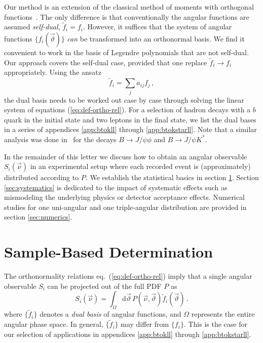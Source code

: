 \documentclass[aps,nofootinbib,preprintnumbers,prd,twocolumn]{revtex4-1}
\newcommand{\dual}[1]{\tilde{#1}}
\newcommand{\nuvec}{\vec{\nu}}
\newcommand{\refeq}[1]{eq.~(\ref{eq:#1})}
\newcommand{\rmdx}[1]{\mbox{d} #1 \,} %
\newcommand{\thvec}{\vec{\vartheta}}
\renewcommand{\theta}{\vartheta}
\begin{document}
Our method is an extension of the classical method of moments with
orthogonal functions~\cite[sec. 8.2]{James:2006zz}. The only difference
is that conventionally the angular functions are assumed
\emph{self-dual}, $\dual{f}_i = f_i$. However, it suffices that the
system of angular functions $\{f_i(\thvec)\}$ \emph{can} be transformed into
an orthonormal basis. We find it convenient to work
in the basis of Legendre polynomials that are not self-dual.
Our approach covers the self-dual case, provided that one
replace $\dual{f}_i \to f_i$ appropriately.
Using the ansatz
\begin{equation}
  \label{eq:dual-ansatz}
  \dual{f}_i = \sum_{j} a_{ij} f_j \,,
\end{equation}
the dual basis needs to be worked out case by case through solving the
linear system of equations (\ref{eq:def-ortho-rel}). For a selection
of hadron decays with a $b$ quark in the initial state and two leptons
in the final state, we list the dual bases in a series of appendices
\ref{app:btokll} through \ref{app:btokstarll}. Note that a
similar analysis was done in~\cite{Dighe:1998vk} for the decays $B \to
J/\psi \phi$ and $B \to J/\psi K^{*}$.

In the remainder of this letter we discuss how to obtain an angular
observable $S_i(\nuvec)$ in an experimental setup where each recorded
event is (approximately) distributed according to $P$.  We establish
the statistical basics in section \ref{sec:sample-based-det}. Section
\ref{sec:systematics} is dedicated to the impact of systematic effects
such as mismodeling the underlying physics or detector acceptance
effects. Numerical studies for one uni-angular and one triple-angular
distribution are provided in section \ref{sec:numerics}.

\section{Sample-Based Determination}
\label{sec:sample-based-det}

The orthonormality relations \refeq{def-ortho-rel} imply that a single angular observable $S_i$
can be projected out of the full PDF $P$ as
\begin{equation}
    \label{eq:det-Pi-analytical}
    S_i(\nuvec) = \int_{\Omega} \rmdx{\vec\theta}  P(\nuvec, \thvec) \dual{f}_i(\thvec)\,.
\end{equation}
where $\lbrace \dual{f}_i \rbrace$ denotes a \emph{dual basis} of angular
functions, and $\Omega$ represents the entire angular phase space. In general,
$\lbrace \dual{f}_i \rbrace$ may differ from $\lbrace f_i \rbrace$. This is the
case for our selection of applications in appendices \ref{app:btokll} through
\ref{app:btokstarll}.\\
\end{document}
